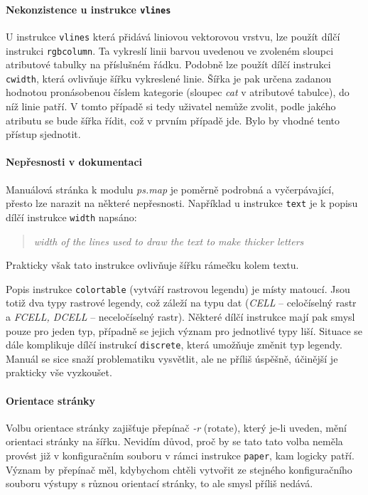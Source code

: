 \documentclass[a4paper,12pt,draft]{article}
\newcommand{\modul}[1]{\emph{#1}}
\newcommand{\instr}[1]{\lstinline[style=psmapInline]|#1|}
\begin{document}
\paragraph*{Nekonzistence u instrukce \instr{vlines}}
\label{sec:psmap:vlines}
U instrukce \instr{vlines} která přidává liniovou vektorovou vrstvu,
lze použít dílčí instrukci \instr{rgbcolumn}. Ta vykreslí   linii
barvou uvedenou ve zvoleném sloupci atributové tabulky na příslušném
řádku. Podobně lze použít dílčí instrukci \instr{cwidth}, která
ovlivňuje šířku vykreslené linie. Šířka je pak určena zadanou hodnotou
pronásobenou číslem kategorie (sloupec \emph{cat} v atributové tabulce),
do níž linie patří. V tomto případě si tedy uživatel nemůže zvolit,
podle jakého atributu se bude šířka řídit, což v prvním případě
jde. Bylo by vhodné tento přístup sjednotit.

\paragraph*{Nepřesnosti v dokumentaci}
\label{sec:psmap:manual}
Manuálová stránka \cite{manual} k modulu \modul{ps.map} je poměrně
podrobná a vyčerpávající, přesto lze narazit na některé
nepřesnosti. Například u instrukce \instr{text} je k popisu dílčí
instrukce \instr{width} napsáno:
 \begin{quotation}\it
width of the lines used to draw the text to make thicker letters
\end{quotation}
Prakticky však tato instrukce ovlivňuje šířku rámečku kolem textu.

Popis instrukce \instr{colortable} (vytváří rastrovou legendu) je místy
matoucí. Jsou totiž dva typy rastrové legendy, což záleží na typu dat
(\emph{CELL} -- celočíselný rastr a \emph{FCELL, DCELL} -- neceločíselný
rastr). Některé dílčí instrukce mají pak smysl pouze pro jeden typ,
případně se jejich význam pro jednotlivé typy liší. Situace se dále
komplikuje dílčí instrukcí \instr{discrete}, která umožňuje změnit
typ legendy. Manuál se sice snaží problematiku vysvětlit, ale ne příliš
úspěšně, účinější je prakticky vše vyzkoušet.

\paragraph*{Orientace stránky}
Volbu orientace stránky zajišťuje přepínač \emph{-r} (rotate), který
je-li uveden, mění orientaci stránky na šířku. Nevidím důvod, proč by
se tato tato volba neměla provést již v konfiguračním souboru v rámci
instrukce \instr{paper}, kam logicky patří. Význam by přepínač měl,
kdybychom chtěli vytvořit ze stejného konfiguračního souboru výstupy
s různou orientací stránky, to ale smysl příliš nedává.
\end{document}
